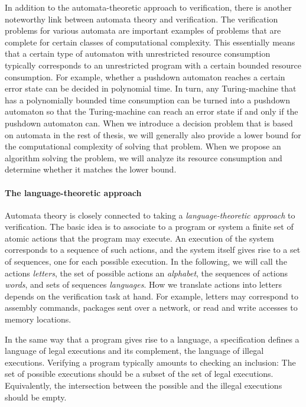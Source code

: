 \documentclass[../../diss.tex]{subfiles}
\begin{document}
In addition to the automata-theoretic approach to verification, there is another noteworthy link between automata theory and verification.
The verification problems for various automata are important examples of problems that are complete for certain classes of computational complexity.
This essentially means that a certain type of automaton with unrestricted resource consumption typically corresponds to an unrestricted program with a certain bounded resource consumption.
For example, whether a pushdown automaton reaches a certain error state can be decided in polynomial time.
In turn, any Turing-machine that has a polynomially bounded time consumption can be turned into a pushdown automaton so that the Turing-machine can reach an error state if and only if the pushdown automaton can.
When we introduce a decision problem that is based on automata in the rest of thesis, we will generally also provide a lower bound for the computational complexity of solving that problem.
When we propose an algorithm solving the problem, we will analyze its resource consumption and determine whether it matches the lower bound.

\paragraph{The language-theoretic approach}

Automata theory is closely connected to taking a \emph{language-theoretic approach} to verification.
The basic idea is to associate to a program or system a finite set of atomic actions that the program may execute.
An execution of the system corresponds to a sequence of such actions, and the system itself gives rise to a set of sequences, one for each possible execution.
In the following, we will call the actions \emph{letters}, the set of possible actions an \emph{alphabet}, the sequences of actions \emph{words}, and sets of sequences \emph{languages}.
How we translate actions into letters depends on the verification task at hand.
For example, letters may correspond to assembly commands, packages sent over a network, or read and write accesses to memory locations.

In the same way that a program gives rise to a language, a specification defines a language of legal executions and its complement, the language of illegal executions.
Verifying a program typically amounts to checking an inclusion: The set of possible executions should be a subset of the set of legal executions.
Equivalently, the intersection between the possible and the illegal executions should be empty.
\end{document}
